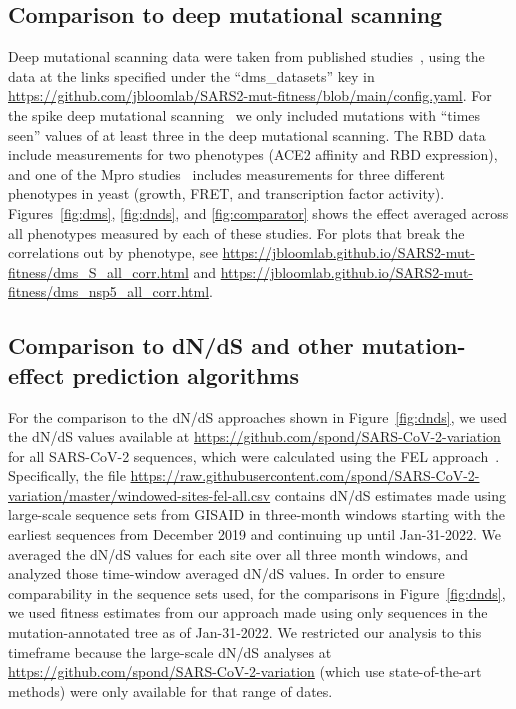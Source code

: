 \documentclass[9pt,twocolumn,twoside]{gsajnl_modified}
\begin{document}
{\subsection{Comparison to deep mutational scanning}
Deep mutational scanning data were taken from published studies~\citep{dadonaite2023pseudovirus,starr2022deep,flynn2022,flynn2023,iketani2022functional}, using the data at the links specified under the ``dms\_datasets'' key in \url{https://github.com/jbloomlab/SARS2-mut-fitness/blob/main/config.yaml}.
For the spike deep mutational scanning~\citep{dadonaite2023pseudovirus} we only included mutations with ``times seen'' values of at least three in the deep mutational scanning.
The RBD data~\citep{starr2022deep} include measurements for two phenotypes (ACE2 affinity and RBD expression), and one of the Mpro studies~\citep{flynn2022} includes measurements for three different phenotypes in yeast (growth, FRET, and transcription factor activity).
Figures~\ref{fig:dms}, \ref{fig:dnds}, and \ref{fig:comparator} shows the effect averaged across all phenotypes measured by each of these studies.
For plots that break the correlations out by phenotype, see \url{https://jbloomlab.github.io/SARS2-mut-fitness/dms_S_all_corr.html} and \url{https://jbloomlab.github.io/SARS2-mut-fitness/dms_nsp5_all_corr.html}.

\subsection{Comparison to dN/dS and other mutation-effect prediction algorithms}
For the comparison to the dN/dS approaches shown in Figure~\ref{fig:dnds}, we used the dN/dS values available at \url{https://github.com/spond/SARS-CoV-2-variation}~\cite{martin2021emergence} for all SARS-CoV-2 sequences, which were calculated using the FEL approach~\cite{kosakovsky2005not}.
Specifically, the file \url{https://raw.githubusercontent.com/spond/SARS-CoV-2-variation/master/windowed-sites-fel-all.csv} contains dN/dS estimates made using large-scale sequence sets from GISAID in three-month windows starting with the earliest sequences from December 2019 and continuing up until Jan-31-2022.
We averaged the dN/dS values for each site over all three month windows, and analyzed those time-window averaged dN/dS values.
In order to ensure comparability in the sequence sets used, for the comparisons in Figure~\ref{fig:dnds}, we used fitness estimates from our approach made using only sequences in the mutation-annotated tree as of Jan-31-2022.
We restricted our analysis to this timeframe because the large-scale dN/dS analyses at \url{https://github.com/spond/SARS-CoV-2-variation} (which use state-of-the-art methods) were only available for that range of dates.

}
\end{document}
